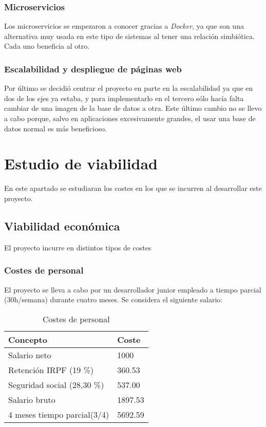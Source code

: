 \subsubsection{Microservicios}
Los microservicios se empezaron a conocer gracias a \emph{Docker}, ya que son una alternativa muy usada en este tipo de sistemas al tener una relación simbiótica. Cada uno beneficia al otro.

\subsubsection{Escalabilidad y despliegue de páginas web}
Por último se decidió centrar el proyecto en parte en la escalabilidad ya que en dos de los ejes ya estaba, y para implementarlo en el tercero sólo hacía falta cambiar de una imagen de la base de datos a otra. Este último cambio no se llevo a cabo porque, salvo en aplicaciones excesivamente grandes, el usar una base de datos normal es más beneficioso.

\section{Estudio de viabilidad}
En este apartado se estudiaran los costes en los que se incurren al desarrollar este proyecto.

\subsection{Viabilidad económica}
El proyecto incurre en distintos tipos de costes

\subsubsection{Costes de personal}
El proyecto se lleva a cabo por un desarrollador junior empleado a tiempo parcial (30h/semana) durante cuatro meses. Se considera el siguiente salario:

\begin{table}[]
\centering
\begin{tabular}{@{}ll@{}}
\toprule
Concepto & Coste \\ \midrule
Salario neto & 1000 \\
Retención IRPF (19 \%) & 360.53 \\
Seguridad social (28,30 \%) & 537.00 \\
Salario bruto & 1897.53 \\ \midrule
4 meses tiempo parcial(3/4) & 5692.59 \\ \bottomrule
\end{tabular}
\caption{Costes de personal}
\label{Salario}
\end{table}

